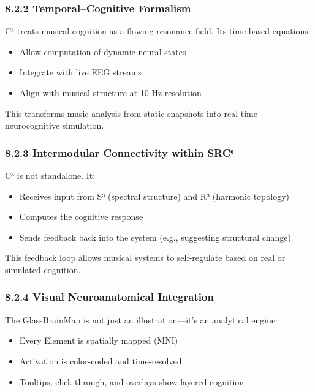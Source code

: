 \documentclass[10pt]{article}
\begin{document}
\subsubsection*{8.2.2 Temporal–Cognitive Formalism}

C³ treats musical cognition as a flowing resonance field. Its time-based equations:

\begin{itemize}
    \item Allow computation of dynamic neural states
    \item Integrate with live EEG streams
    \item Align with musical structure at 10 Hz resolution
\end{itemize}

This transforms music analysis from static snapshots into real-time neurocognitive simulation.

\subsubsection*{8.2.3 Intermodular Connectivity within SRC⁹}

C³ is not standalone. It:

\begin{itemize}
    \item Receives input from S³ (spectral structure) and R³ (harmonic topology)
    \item Computes the cognitive response
    \item Sends feedback back into the system (e.g., suggesting structural change)
\end{itemize}

This feedback loop allows musical systems to self-regulate based on real or simulated cognition.

\subsubsection*{8.2.4 Visual Neuroanatomical Integration}

The GlassBrainMap is not just an illustration—it’s an analytical engine:

\begin{itemize}
    \item Every Element is spatially mapped (MNI)
    \item Activation is color-coded and time-resolved
    \item Tooltips, click-through, and overlays show layered cognition
\end{itemize}
\end{document}
